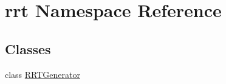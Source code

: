 \hypertarget{namespacerrt}{\section{rrt Namespace Reference}
\label{namespacerrt}
}
\subsection*{Classes}
\begin{DoxyCompactItemize}
\item 
class \hyperlink{classrrt_1_1RRTGenerator}{R\-R\-T\-Generator}
\end{DoxyCompactItemize}
